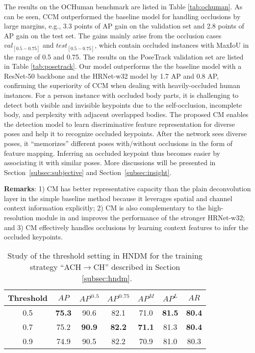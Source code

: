 \documentclass[twocolumn]{svjour3}          \smartqed  \usepackage{natbib}
\begin{document}
The results on the OCHuman benchmark are listed in Table \ref{tab:ochuman}. As can be seen, CCM outperformed the baseline model for handling occlusions by large margins, e.g., 3.3 points of AP gain on the validation set and 2.8 points of AP gain on the test set. The gains mainly arise from the occlusion cases $val_{[0.5-0.75]}$ and $test_{[0.5-0.75]}$, which contain occluded instances with MaxIoU in the range of 0.5 and 0.75. The results on the PoseTrack validation set are listed in Table \ref{tab:posetrack}. Our model outperforms the the baseline model with a ResNet-50 backbone and the HRNet-w32 model by 1.7 AP and 0.8 AP, confirming the superiority of CCM when dealing with heavily-occluded human instances. For a person instance with occluded body parts, it is challenging to detect both visible and invisible keypoints due to the self-occlusion, incomplete body, and perplexity with adjacent overlapped bodies. The proposed CM enables the detection model to learn discriminative feature representation for diverse poses and help it to recognize occluded keypoints. After the network sees diverse poses, it ``memorizes'' different poses with/without occlusions in the form of feature mapping. Inferring an occluded keypoint thus becomes easier by associating it with similar poses. More discussions will be presented in Section~\ref{subsec:subjective} and Section~\ref{subsec:insight}.

\textbf{Remarks}: 1) CM has better representative capacity than the plain deconvolution layer in the simple baseline method \citep{xiao2018simple} because it leverages spatial and channel context information explicitly; 2) CM is also complementary to the high-resolution module in \citep{sun2019deep} and improves the performance of the stronger HRNet-w32; and 3) CM effectively handles occlusions by learning context features to infer the occluded keypoints.

\begin{table}[htbp]
\centering
  \caption{Study of the threshold setting in HNDM for the training strategy ``ACH$\to$CH'' described in Section ~\ref{subsec:hndm}.}
    \begin{tabular}{ccccccc}
    \toprule
    Threshold    & $AP$    & $AP^{@.5}$  & $AP^{@.75}$  & $AP^M$   & $AP^L$ & $AR$ \\
    \midrule
    0.5  & \textbf{75.3}  & 90.6  & 82.1  & 71.0  & \textbf{81.5}  & \textbf{80.4}\\
    0.7 & 75.2  & \textbf{90.9}  & \textbf{82.2}  & \textbf{71.1}  & 81.3 & \textbf{80.4} \\
    0.9 & 74.9 & 90.5  & 82.2  & 70.9  & 81.0 & 80.3 \\
    \bottomrule
    \end{tabular}\label{tab:ablation_hnem_threshold}\end{table}
\end{document}
